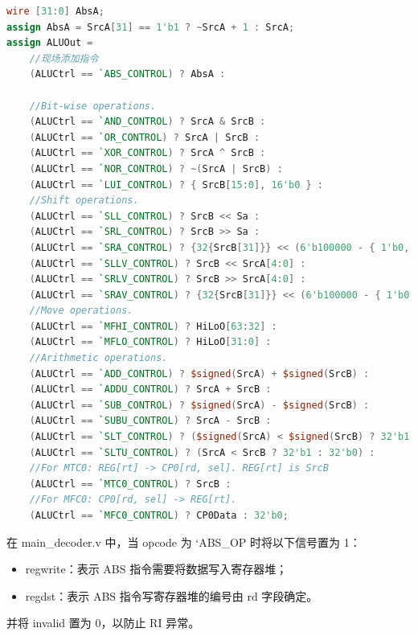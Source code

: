 \begin{lstlisting}[language=Verilog]
wire [31:0] AbsA;
assign AbsA = SrcA[31] == 1'b1 ? ~SrcA + 1 : SrcA;
assign ALUOut = 
    //现场添加指令
    (ALUCtrl == `ABS_CONTROL) ? AbsA :

    //Bit-wise operations.
    (ALUCtrl == `AND_CONTROL) ? SrcA & SrcB :
    (ALUCtrl == `OR_CONTROL) ? SrcA | SrcB :
    (ALUCtrl == `XOR_CONTROL) ? SrcA ^ SrcB :
    (ALUCtrl == `NOR_CONTROL) ? ~(SrcA | SrcB) :
    (ALUCtrl == `LUI_CONTROL) ? { SrcB[15:0], 16'b0 } :
    //Shift operations.
    (ALUCtrl == `SLL_CONTROL) ? SrcB << Sa :
    (ALUCtrl == `SRL_CONTROL) ? SrcB >> Sa :
    (ALUCtrl == `SRA_CONTROL) ? {32{SrcB[31]}} << (6'b100000 - { 1'b0, Sa }) | SrcB >> Sa :
    (ALUCtrl == `SLLV_CONTROL) ? SrcB << SrcA[4:0] :
    (ALUCtrl == `SRLV_CONTROL) ? SrcB >> SrcA[4:0] :
    (ALUCtrl == `SRAV_CONTROL) ? {32{SrcB[31]}} << (6'b100000 - { 1'b0, SrcA[4:0] }) | SrcB >> SrcA[4:0] :
    //Move operations.
    (ALUCtrl == `MFHI_CONTROL) ? HiLoO[63:32] :
    (ALUCtrl == `MFLO_CONTROL) ? HiLoO[31:0] :
    //Arithmetic operations.
    (ALUCtrl == `ADD_CONTROL) ? $signed(SrcA) + $signed(SrcB) :
    (ALUCtrl == `ADDU_CONTROL) ? SrcA + SrcB :
    (ALUCtrl == `SUB_CONTROL) ? $signed(SrcA) - $signed(SrcB) :
    (ALUCtrl == `SUBU_CONTROL) ? SrcA - SrcB :
    (ALUCtrl == `SLT_CONTROL) ? ($signed(SrcA) < $signed(SrcB) ? 32'b1 : 32'b0) :
    (ALUCtrl == `SLTU_CONTROL) ? (SrcA < SrcB ? 32'b1 : 32'b0) : 
    //For MTC0: REG[rt] -> CP0[rd, sel]. REG[rt] is SrcB
    (ALUCtrl == `MTC0_CONTROL) ? SrcB :
    //For MFC0: CP0[rd, sel] -> REG[rt].
    (ALUCtrl == `MFC0_CONTROL) ? CP0Data : 32'b0;
\end{lstlisting}

在 main\_decoder.v 中，当 opcode 为 `ABS\_OP 时将以下信号置为 1：
\begin{itemize}
    \item regwrite：表示 ABS 指令需要将数据写入寄存器堆；
    \item regdst：表示 ABS 指令写寄存器堆的编号由 rd 字段确定。
\end{itemize}
并将 invalid 置为 0，以防止 RI 异常。

